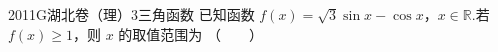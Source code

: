 
\begin{problem}{2011}{G}{湖北卷（理）}{3}{三角函数}
已知函数 $f(x)=\sqrt{3}\sin x-\cos x$，$x\in\mathbb{R}$.若 $f(x)\geq1$，则 $x$ 的取值范围为 \hspace{1cm}（　　）
\begin{choices}
\end{choices}
\end{problem}

\begin{answer}

\end{answer}

\begin{solutions}

\end{solutions}